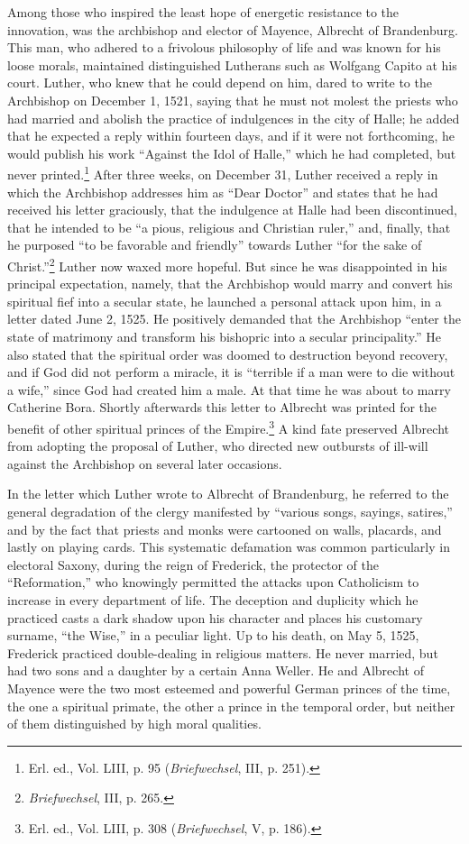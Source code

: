 Among those who inspired the least hope of energetic resistance
to the innovation, was the archbishop and elector of Mayence,
Albrecht of Brandenburg. This man, who adhered to a frivolous
philosophy of life and was known for his loose morals, maintained
distinguished Lutherans such as Wolfgang Capito at his court.
Luther, who knew that he could depend on him, dared to write to
the Archbishop on December 1, 1521, saying that he must not molest
the priests who had married and abolish the practice of indulgences
in the city of Halle; he added that he expected a reply within
fourteen days, and if it were not forthcoming, he would publish
his work “Against the Idol of Halle,” which he had completed, but
never printed.\footnote{Erl. ed., Vol. LIII, p. 95 (\textit{Briefwechsel}, III, p. 251).}
After three weeks, on December 31, Luther received
a reply in which the Archbishop addresses him as “Dear Doctor”
and states that he had received his letter graciously, that the indulgence
at Halle had been discontinued, that he intended to be
“a pious, religious and Christian ruler,” and, finally, that he purposed
“to be favorable and friendly” towards Luther “for the sake
of Christ.”\footnote{\textit{Briefwechsel}, III, p. 265.}
Luther now waxed more hopeful. But since he was
disappointed in his principal expectation, namely, that the Archbishop
would marry and convert his spiritual fief into a secular
state, he launched a personal attack upon him, in a letter dated June
2, 1525. He positively demanded that the Archbishop “enter the state
of matrimony and transform his bishopric into a secular principality.”
He also stated that the spiritual order was doomed to destruction beyond
recovery, and if God did not perform a miracle,
it is “terrible if a man were to die without a wife,” since God had
created him a male. At that time he was about to marry Catherine
Bora. Shortly afterwards this letter to Albrecht was printed for the
benefit of other spiritual princes of the Empire.\footnote
{Erl. ed., Vol. LIII, p. 308 (\textit{Briefwechsel}, V, p. 186).}
A kind fate preserved
Albrecht from adopting the proposal of Luther, who directed
new outbursts of ill-will against the Archbishop on several later
occasions.

In the letter which Luther wrote to Albrecht of Brandenburg,
he referred to the general degradation of the clergy manifested by
“various songs, sayings, satires,” and by the fact that priests and
monks were cartooned on walls, placards, and lastly on playing
cards. This systematic defamation was common particularly in electoral
Saxony, during the reign of Frederick, the protector of the
“Reformation,” who knowingly permitted the attacks upon Catholicism
to increase in every department of life. The deception and
duplicity which he practiced casts a dark shadow upon his character
and places his customary surname, “the Wise,” in a peculiar light.
Up to his death, on May 5, 1525, Frederick practiced double-dealing
in religious matters. He never married, but had two sons and
a daughter by a certain Anna Weller. He and Albrecht of Mayence
were the two most esteemed and powerful German princes of the
time, the one a spiritual primate, the other a prince in the temporal
order, but neither of them distinguished by high moral qualities.

